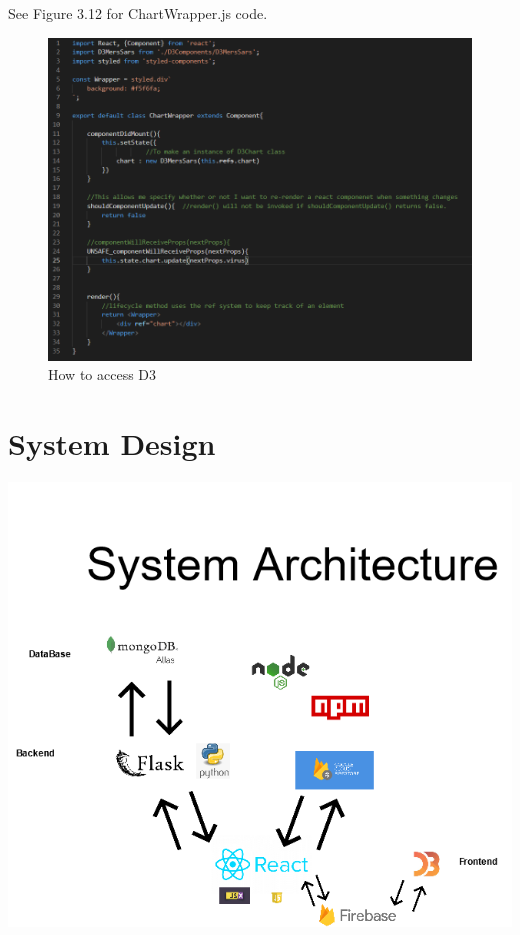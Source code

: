 See Figure 3.12 for ChartWrapper.js code.


\begin{figure}[H]
    \centering
    \includegraphics[scale=0.5]{img/D3Ref.PNG}
    \caption{How to access D3}
    \label{fig:my_label4}
\end{figure}

\chapter{System Design}
\begin{center}
      \includegraphics[scale=0.5]{img/basic architecture.png}
\end{center}



